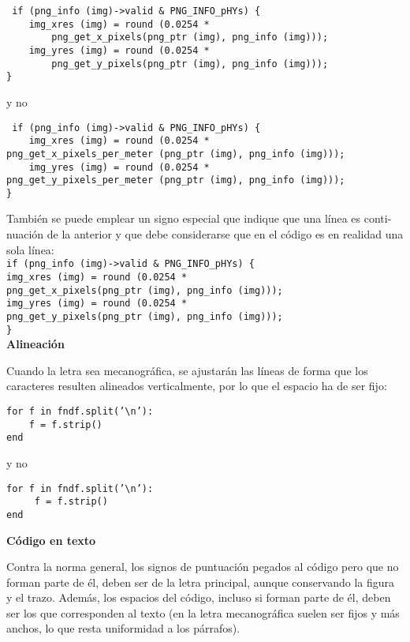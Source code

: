 \begin{verbatim}
 if (png_info (img)->valid & PNG_INFO_pHYs) {
    img_xres (img) = round (0.0254 *
        png_get_x_pixels(png_ptr (img), png_info (img)));
    img_yres (img) = round (0.0254 *
        png_get_y_pixels(png_ptr (img), png_info (img)));
}
\end{verbatim}

y no

\begin{verbatim}
 if (png_info (img)->valid & PNG_INFO_pHYs) {
    img_xres (img) = round (0.0254 *
png_get_x_pixels_per_meter (png_ptr (img), png_info (img)));
    img_yres (img) = round (0.0254 *
png_get_y_pixels_per_meter (png_ptr (img), png_info (img)));
}
\end{verbatim}

 También se puede emplear un signo especial que indique que una línea es conti-
nuación de la anterior y que debe considerarse que en el código es en realidad una
sola línea:\\


\noindent\verb|if (png_info (img)->valid & PNG_INFO_pHYs) {|\\
    \indent\verb|img_xres (img) = round (0.0254 *|\\
	\indent\indent\ArrowBoldDownRight  \verb|png_get_x_pixels(png_ptr (img), png_info (img)));|\\
    \indent\verb|img_yres (img) = round (0.0254 *|\\
	\indent\indent\ArrowBoldDownRight  \verb|png_get_y_pixels(png_ptr (img), png_info (img)));|\\
\verb|}|\\

\noindent\textbf{Alineación}

Cuando la letra sea mecanográfica, se ajustarán las líneas de forma que los caracteres
resulten alineados verticalmente, por lo que el espacio ha de ser fijo:
\begin{verbatim}
for f in fndf.split(’\n’):
    f = f.strip()
end
\end{verbatim}
y no
\begin{verbatim}
for f in fndf.split(’\n’):
     f = f.strip()
end
\end{verbatim}


\noindent\textbf{Código en texto}

Contra la norma general, los signos de puntuación pegados al código pero que no
forman parte de él, deben ser de la letra principal, aunque conservando la figura y el
trazo. Además, los espacios del código, incluso si forman parte de él, deben ser los
que corresponden al texto (en la letra mecanográfica suelen ser fijos y más anchos,
lo que resta uniformidad a los párrafos).\\

